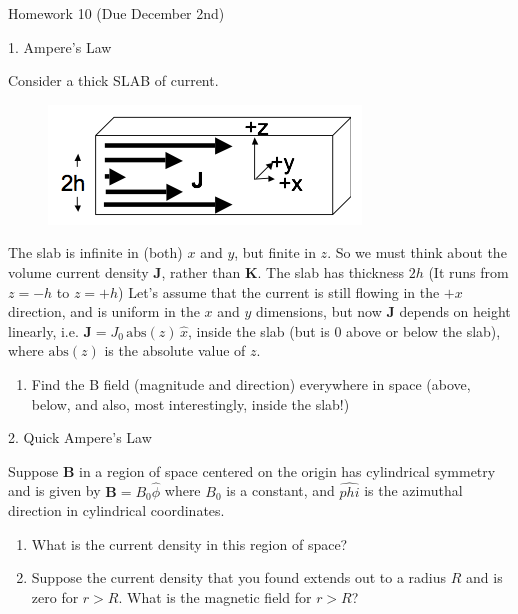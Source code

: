 \documentclass[11pt]{article}
\def\tightlist{}
\begin{document}
{\LARGE Homework 10 (Due December
2nd)}\label{homework-10-due-december-2nd}

{\Large 1. Ampere's Law}\label{amperes-law}

Consider a thick SLAB of current.

\begin{figure}[htbp]
\centering
\includegraphics[width=0.6\linewidth]{./images/hw10/thick_slab.png}
\end{figure}

The slab is infinite in (both) \(x\) and \(y\), but finite in \(z\). So
we must think about the volume current density \(\mathbf{J}\), rather
than \(\mathbf{K}\). The slab has thickness \(2h\) (It runs from
\(z=-h\) to \(z=+h\)) Let's assume that the current is still flowing in
the \(+x\) direction, and is uniform in the \(x\) and \(y\) dimensions,
but now \(\mathbf{J}\) depends on height linearly, i.e.
\(\mathbf{J} = J_0\,\mathrm{abs}(z)\,\hat{x}\), inside the slab (but is
0 above or below the slab), where \(\mathrm{abs}(z)\) is the absolute
value of \(z\).

\begin{enumerate}
\def\labelenumi{\arabic{enumi}.}
\tightlist
\item
  Find the B field (magnitude and direction) everywhere in space (above,
  below, and also, most interestingly, inside the slab!)
\end{enumerate}

{\Large 2. Quick Ampere's Law}\label{quick-amperes-law}

Suppose \(\mathbf{B}\) in a region of space centered on the origin has
cylindrical symmetry and is given by \(\mathbf{B} = B_0\hat{\phi}\)
where \(B_0\) is a constant, and \(\hat{phi}\) is the azimuthal
direction in cylindrical coordinates.

\begin{enumerate}
\def\labelenumi{\arabic{enumi}.}
\tightlist
\item
  What is the current density in this region of space?
\item
  Suppose the current density that you found extends out to a radius
  \(R\) and is zero for \(r > R\). What is the magnetic field for
  \(r > R\)?
\end{enumerate}
\end{document}
